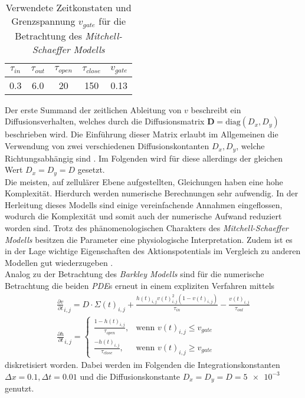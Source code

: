 \begin{table}[H]
\centering
\begin{tabular}{|c|c|c|c|c|}
$\tau_{in}$ & $\tau_{out}$ & $\tau_{open}$ & $\tau_{close}$ & $v_{gate}$ \\ 
\hline 
\hline 
0.3 & 6.0 & 20 & 150 & 0.13 \\ 
\hline 
\end{tabular} 
\caption{Verwendete Zeitkonstaten und Grenzspannung $v_{gate}$ für die Betrachtung des \textit{Mitchell-Schaeffer Modells}}
\label{tab:ms_parameters}
\end{table}

Der erste Summand der zeitlichen Ableitung von $v$ beschreibt ein Diffusionsverhalten, welches durch die Diffusionsmatrix $\mathbf{D} = \text{diag}(D_x, D_y)$ beschrieben wird. Die Einführung dieser Matrix erlaubt im Allgemeinen die Verwendung von zwei verschiedenen Diffusionskontanten $D_x, D_y$, welche Richtungsabhängig sind \citep{talbot2013towards}. Im Folgenden wird für diese allerdings der gleichen Wert $D_x = D_y = D$ gesetzt.\\

Die meisten, auf zellulärer Ebene aufgestellten, Gleichungen haben eine hohe Komplexität. Hierdurch werden numerische Berechnungen sehr aufwendig. In der Herleitung dieses Modells sind einige vereinfachende Annahmen eingeflossen, wodurch die Komplexität und somit auch der numerische Aufwand reduziert worden sind. Trotz des phänomenologischen Charakters des \textit{Mitchell-Schaeffer Modells} besitzen die Parameter eine physiologische Interpretation. Zudem ist es in der Lage wichtige Eigenschaften des Aktionspotentials im Vergleich zu anderen Modellen gut wiederzugeben \citep{talbot2013towards}.\\

Analog zu der Betrachtung des \textit{Barkley Modells} sind für die numerische Betrachtung die beiden \textit{PDE}s erneut in einem expliziten Verfahren mittels
\begin{equation}
\begin{gathered}
\frac{\partial v}{\partial t}_{i,j} = D \cdot \Sigma(t)_{i,j} + \frac{h(t)_{i,j} v(t)_{i,j}^2(1-v(t)_{i,j})}{\tau_{in}} - \frac{v(t)_{i,j}}{\tau_{out}}\\
\frac{\partial h}{\partial t}_{i,j} = \begin{cases}
	\frac{1-h(t)_{i,j}}{\tau_{open}},& \text{wenn } v(t)_{i,j} \leq v_{gate}\\
    \frac{-h(t)_{i,j}}{\tau_{close}},& \text{wenn } v(t)_{i,j} \geq v_{gate}
\end{cases}
\end{gathered}
\end{equation}
diskretisiert worden. Dabei werden im Folgenden die Integrationskonstanten $\Delta x = 0.1, \Delta t = 0.01$ und die Diffusionskonstante $D_x = D_y = D = \num{5e-3}$ genutzt.\\